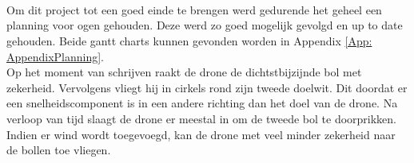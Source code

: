 \\
\\
\\
Om dit project tot een goed einde te brengen werd gedurende het geheel een planning voor ogen gehouden. Deze werd zo goed mogelijk gevolgd en up to date gehouden. Beide gantt charts kunnen gevonden worden in Appendix \ref{App: AppendixPlanning}.
\\
Op het moment van schrijven raakt de drone de dichtstbijzijnde bol met zekerheid. Vervolgens vliegt hij in cirkels rond zijn tweede doelwit. Dit doordat er een snelheidscomponent is in een andere richting dan het doel van de drone. Na verloop van tijd slaagt de drone er meestal in om de tweede bol te doorprikken. Indien er wind wordt toegevoegd, kan de drone met veel minder zekerheid naar de bollen toe vliegen. 
